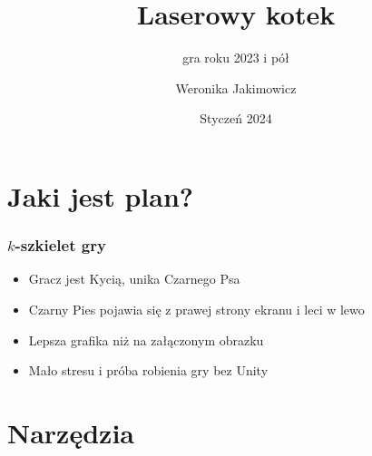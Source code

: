 \documentclass{beamer}
\title{Laserowy kotek}
\subtitle{gra roku 2023 i pół}
\author{Weronika Jakimowicz}
\date{Styczeń 2024}
\begin{document}
\begin{frame}
  \maketitle 
\end{frame}

\section{Jaki jest plan?}

\begin{frame}
  \frametitle{$k$-szkielet gry}

  \begin{itemize}
    \item Gracz jest Kycią, unika Czarnego Psa
    \item Czarny Pies pojawia się z prawej strony ekranu i leci w lewo

  \item Lepsza grafika niż na załączonym obrazku

  \begin{center}
  \end{center}

    \item Mało stresu i próba robienia gry bez Unity
  \end{itemize}

  
\end{frame}

\section{Narzędzia}
\end{document}
